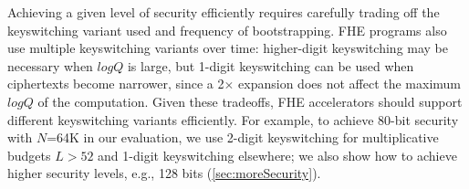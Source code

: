 Achieving a given level of security efficiently requires carefully trading off
the keyswitching variant used and frequency of bootstrapping.
FHE programs also use multiple keyswitching variants over time:
higher-digit keyswitching may be necessary when $logQ$ is large,
but 1-digit keyswitching can be used when ciphertexts become narrower,
since a 2$\times$ expansion
does not affect the maximum $logQ$ of the computation.
Given these tradeoffs, FHE accelerators should support different keyswitching variants efficiently.
%
For example, to achieve 80-bit security with $N$=64K in our evaluation,
we use 2-digit keyswitching for multiplicative budgets $L>52$ and 1-digit keyswitching elsewhere;
we also show how to achieve higher security levels, e.g., 128 bits (\autoref{sec:moreSecurity}).



